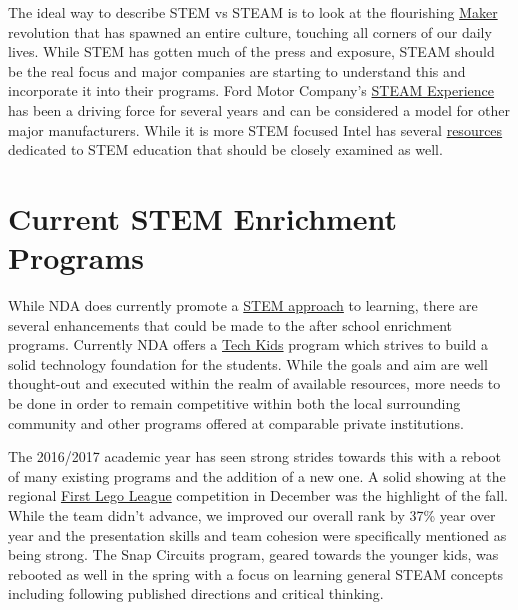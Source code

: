 \documentclass{article}
\begin{document}
The ideal way to describe STEM vs STEAM is to look at the flourishing \href{https://www.theatlantic.com/business/archive/2016/06/why-the-maker-movement-matters-part-1-the-tools-revolution/485720/}{Maker} revolution that has spawned an entire culture, touching all corners of our daily lives. While STEM has gotten much of the press and exposure, STEAM should be the real focus and major companies are starting to understand this and incorporate it into their programs. Ford Motor Company's \href{https://campaign-social.ford.com/content/campaign/ford-steam/index.html}{STEAM Experience} has been a driving force for several years and can be considered a model for other major manufacturers. While it is more STEM focused Intel has several \href{http://www.intel.com/content/dam/www/program/education/us/en/documents/stem-resources-k12-educators.pdf}{resources} dedicated to STEM education that should be closely examined as well.

\section*{Current STEM Enrichment Programs}
While NDA does currently promote a \href{http://www.ndatyngsboro.org/lower/stem}{STEM approach} to learning, there are several enhancements that could be made to the after school enrichment programs. Currently NDA offers a \href{http://www.ndatyngsboro.org/activities-camp/tech-kids}{Tech Kids} program which strives to build a solid technology foundation for the students. While the goals and aim are well thought-out and executed within the realm of available resources, more needs to be done in order to remain competitive within both the local surrounding community and other programs offered at comparable private institutions. 

The 2016/2017 academic year has seen strong strides towards this with a reboot of many existing programs and the addition of a new one. A solid showing at the regional \href{https://www.firstinspires.org/robotics/fll}{First Lego League} competition in December was the highlight of the fall. While the team didn't advance, we improved our overall rank by 37\% year over year and the presentation skills and team cohesion were specifically mentioned as being strong. The Snap Circuits program, geared towards the younger kids, was rebooted as well in the spring with a focus on learning general STEAM concepts including following published directions and critical thinking.
\end{document}
